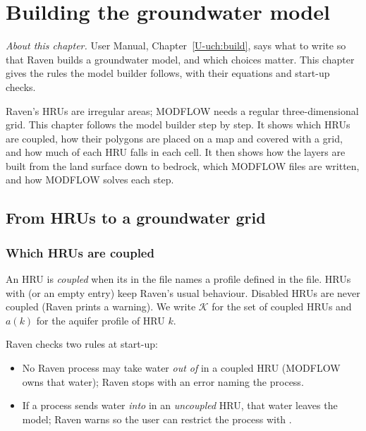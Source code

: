 \chapter{Building the groundwater model}\label{ch:c3}
\noindent\emph{About this chapter.} User Manual, Chapter~\ref{U-uch:build}, says what to write so that Raven
builds a groundwater model, and which choices matter. This chapter gives the rules the model builder follows, with
their equations and start-up checks.

Raven's HRUs are irregular areas; MODFLOW needs a regular three-dimensional grid. This chapter follows the model builder step by step. It shows which HRUs are coupled, how their polygons are placed on a map
and covered with a grid, and how much of each HRU falls in each cell. It then shows how the layers are built from the land
surface down to bedrock, which MODFLOW files are written, and how MODFLOW solves each step.

\section{From HRUs to a groundwater grid}\label{ch:grid}
\subsection{Which HRUs are coupled}
An HRU is \emph{coupled} when its  in the  file names a profile defined in the
 file. HRUs with \cmd{[NONE]} (or an empty entry) keep Raven's usual behaviour. Disabled HRUs are never
coupled (Raven prints a warning). We write $\mathcal{K}$ for the set of coupled HRUs and $a(k)$ for the aquifer profile of HRU $k$.

Raven checks two rules at start-up:
\begin{itemize}
\item No Raven process may take water \emph{out of}  in a coupled HRU (MODFLOW owns that water);
Raven stops with an error naming the process.
\item If a process sends water \emph{into}  in an \emph{uncoupled} HRU, that water leaves the model;
Raven warns so the user can restrict the process with .
\end{itemize}

